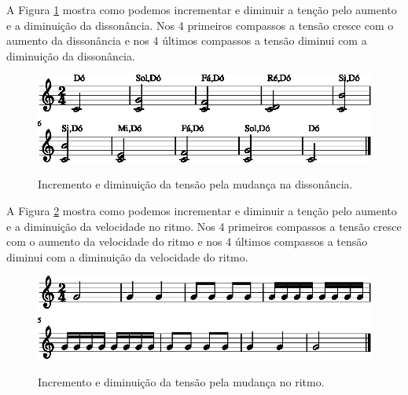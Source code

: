 \begin{example}
A Figura \ref{fig:tension-release-dissonancia-1} mostra como podemos incrementar e diminuir a tenção
pelo aumento e a diminuição da dissonância. 
Nos 4 primeiros compassos a tensão cresce com o aumento da dissonância 
e nos 4 últimos compassos a tensão diminui com a diminuição da dissonância.
\end{example}
\begin{figure}[!h]
     \centering
     \href{https://drive.google.com/file/d/1V6rufSjdFYfoXJ7RCRuaU94BS-0nTf1K/view?usp=sharing}{\includegraphics[width=1.0\textwidth]{chapters/cap-musica-topicos/tension-release-dissonancia-1.eps}}
     \caption{Incremento e diminuição da tensão pela mudança na dissonância.}
     \label{fig:tension-release-dissonancia-1}
\end{figure}


\begin{example}
A Figura \ref{fig:tension-release-ritmo-1} mostra como podemos incrementar e diminuir a tenção 
pelo aumento e a diminuição da velocidade no ritmo. 
Nos 4 primeiros compassos a tensão cresce com o aumento da velocidade do ritmo 
e nos 4 últimos compassos a tensão diminui com a diminuição da velocidade do ritmo.
\end{example}
\begin{figure}[!h]
     \centering
     \href{https://drive.google.com/file/d/1LzdYJrIQQxE8laAXIXnt7Qkij2Z351E2/view?usp=sharing}{\includegraphics[width=1.0\textwidth]{chapters/cap-musica-topicos/tension-release-ritmo-1.eps}}
     \caption{Incremento e diminuição da tensão pela mudança no ritmo.}
     \label{fig:tension-release-ritmo-1}
\end{figure}

